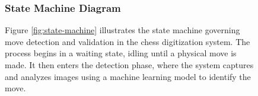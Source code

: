 \begin{figure}[H]
    \subsubsection*{State Machine Diagram}
    \label{subsubsec:state-machine-diagram}

    \centering
    \begin{minipage}[t]{0.5\textwidth}
        Figure \ref{fig:state-machine} illustrates the state machine governing move detection and validation in the chess digitization system. The process begins in a waiting state, idling until a physical move is made. It then enters the detection phase, where the system captures and analyzes images using a machine learning model to identify the move. \\


\end{minipage}
\end{figure}

